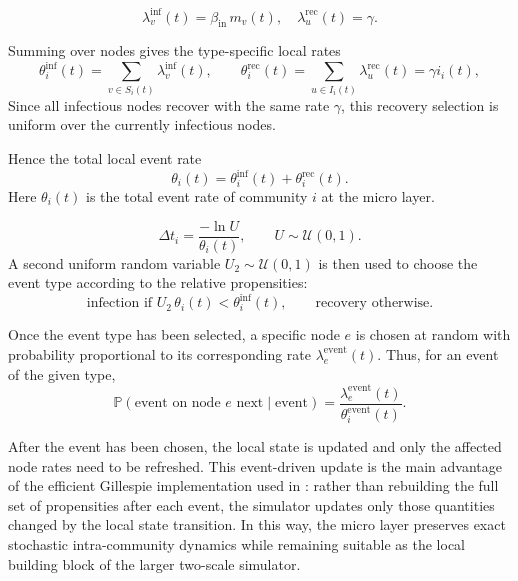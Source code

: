 \documentclass[12pt]{article}
\begin{document}
\[
\lambda^{\mathrm{inf}}_v(t)=\beta_{\mathrm{in}}\, m_v(t),
\quad
\lambda^{\mathrm{rec}}_u(t)=\gamma.
\]

Summing over nodes gives the type-specific local rates
\[
\theta_i^{\mathrm{inf}}(t)=\sum_{v\in S_i(t)} \lambda^{\mathrm{inf}}_v(t),
\qquad
\theta_i^{\mathrm{rec}}(t)=\sum_{u\in I_i(t)} \lambda^{\mathrm{rec}}_u(t)=\gamma i_i(t),
\]
Since all infectious nodes recover with the same rate \(\gamma\), this recovery selection is uniform over the currently infectious nodes. 

Hence the total local event rate
\[
\theta_i(t)=\theta_i^{\mathrm{inf}}(t)+\theta_i^{\mathrm{rec}}(t).
\]
Here \(\theta_i(t)\) is the total event rate of community \(i\) at the micro layer.

\[
\Delta t_i=\frac{-\ln U}{\theta_i(t)},
\qquad U\sim\mathcal U(0,1).
\]
A second uniform random variable \(U_2\sim\mathcal U(0,1)\) is then used to choose the event type according to the relative propensities:
\[
\text{infection if } U_2\,\theta_i(t) < \theta_i^{\mathrm{inf}}(t),
\qquad
\text{recovery otherwise.}
\]

Once the event type has been selected, a specific node $e$ is chosen at random with probability proportional to its corresponding rate \(\lambda^{\mathrm{event}}_e(t)\). Thus, for an event of the given type,
\[
\mathbb P(\text{event on node } e \text{ next}\mid \mathrm{event})=
\frac{\lambda^{\mathrm{event}}_e(t)}{\theta_i^{\mathrm{event}}(t)}.
\]

After the event has been chosen, the local state is updated and only the affected node rates need to be refreshed. This event-driven update is the main advantage of the efficient Gillespie implementation used in \cite{kuryliak2025simulating}: rather than rebuilding the full set of propensities after each event, the simulator updates only those quantities changed by the local state transition. In this way, the micro layer preserves exact stochastic intra-community dynamics while remaining suitable as the local building block of the larger two-scale simulator.
\end{document}
